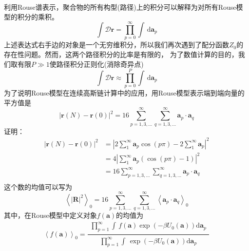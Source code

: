 利用Rouse谱表示，聚合物的所有构型(路径)上的积分可以解释为对所有Rouse模型的积分的乘积。
\begin{equation}\label{250}
\int \mathcal{D}\mathbf{r}= \prod_{p=0}^{\infty} \int \, \mathrm{d} \mathbf{a}_p
\end{equation}
上述表达式右手边的对象是一个无穷维积分，所以我们再次遇到了配分函数$Z_0$的存在性问题。然而，这两个路径积分的比率是有限的，
为了数值计算的目的，我们取有限$P\gg1$使路径积分正则化(消除奇异点)
\begin{equation}\label{251}
\int \mathcal{D}\mathbf{r}\approx \prod_{p=0}^{P} \int \, \mathrm{d} \mathbf{a}_p\end{equation}
为了说明Rouse模型在连续高斯链计算中的应用，用Rouse模型表示端到端向量的平方值是
\begin{equation}\label{252}
\left | \mathbf{r}(N)-\mathbf{r}(0) \right |^2=16\sum_{p=1,3,...}^{\infty}\sum_{q=1,3,...}^{\infty} \mathbf{a}_p \cdot \mathbf{a}_q
\end{equation}
证明：
\begin{equation*}
\begin{aligned}
\left | \mathbf{r}(N)-\mathbf{r}(0) \right |^2 & =\left | 2\sum_{1}^{\infty}\mathbf{a}_p\cos (p\pi)-2\sum_{1}^{\infty}\mathbf{a}_p \right |^2\\ & =4\left | \sum_{1}^{\infty}\mathbf{a}_p(\cos(p\pi)-1) \right |^2 \\ & =16\sum_{p=1,3,...}^{\infty}\sum_{q=1,3,...}^{\infty} \mathbf{a}_p \cdot \mathbf{a}_q\\
\end{aligned}
\end{equation*}
这个数的均值可以写为
\begin{equation}\label{253}
\left \langle \left| \mathbf{R} \right|^2 \right \rangle _0=16\sum_{p=1,3,...}^{\infty}\sum_{q=1,3,...}^{\infty} \left \langle \mathbf{a}_p \cdot \mathbf{a}_q \right \rangle _0 
\end{equation}
其中，在Rouse模型中定义对象$f(\mathbf{a})$的均值为
\begin{equation}\label{254}
\left \langle f(\mathbf{a}) \right \rangle _0=\frac{\begin{matrix} \prod_{p=1}^{\infty} \int \,f(\mathbf{a})\exp(-\beta U_0(\mathbf{a})) \mathrm{d} \mathbf{a}_p  \end{matrix}}{\begin{matrix} \prod_{p=1}^{\infty} \int \,\exp(-\beta U_0(\mathbf{a})) \mathrm{d} \mathbf{a}_p  \end{matrix}}
\end{equation}
